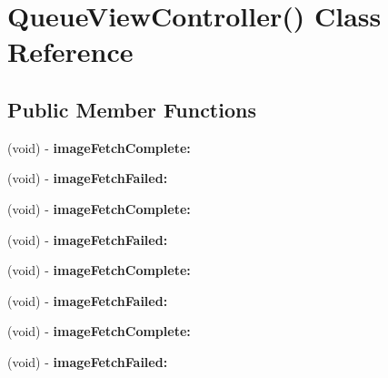 \hypertarget{interface_queue_view_controller_07_08}{
\section{\-Queue\-View\-Controller() \-Class \-Reference}
\label{interface_queue_view_controller_07_08}
}
\subsection*{\-Public \-Member \-Functions}
\begin{DoxyCompactItemize}
\item 
\hypertarget{interface_queue_view_controller_07_08_a1e28d548555b4e9bf66edc2ab9dcfb21}{
(void) -\/ {\bfseries image\-Fetch\-Complete\-:}}
\label{interface_queue_view_controller_07_08_a1e28d548555b4e9bf66edc2ab9dcfb21}

\item 
\hypertarget{interface_queue_view_controller_07_08_ad374c24829f4b37d327caa3f44343633}{
(void) -\/ {\bfseries image\-Fetch\-Failed\-:}}
\label{interface_queue_view_controller_07_08_ad374c24829f4b37d327caa3f44343633}

\item 
\hypertarget{interface_queue_view_controller_07_08_a1e28d548555b4e9bf66edc2ab9dcfb21}{
(void) -\/ {\bfseries image\-Fetch\-Complete\-:}}
\label{interface_queue_view_controller_07_08_a1e28d548555b4e9bf66edc2ab9dcfb21}

\item 
\hypertarget{interface_queue_view_controller_07_08_ad374c24829f4b37d327caa3f44343633}{
(void) -\/ {\bfseries image\-Fetch\-Failed\-:}}
\label{interface_queue_view_controller_07_08_ad374c24829f4b37d327caa3f44343633}

\item 
\hypertarget{interface_queue_view_controller_07_08_a1e28d548555b4e9bf66edc2ab9dcfb21}{
(void) -\/ {\bfseries image\-Fetch\-Complete\-:}}
\label{interface_queue_view_controller_07_08_a1e28d548555b4e9bf66edc2ab9dcfb21}

\item 
\hypertarget{interface_queue_view_controller_07_08_ad374c24829f4b37d327caa3f44343633}{
(void) -\/ {\bfseries image\-Fetch\-Failed\-:}}
\label{interface_queue_view_controller_07_08_ad374c24829f4b37d327caa3f44343633}

\item 
\hypertarget{interface_queue_view_controller_07_08_a1e28d548555b4e9bf66edc2ab9dcfb21}{
(void) -\/ {\bfseries image\-Fetch\-Complete\-:}}
\label{interface_queue_view_controller_07_08_a1e28d548555b4e9bf66edc2ab9dcfb21}

\item 
\hypertarget{interface_queue_view_controller_07_08_ad374c24829f4b37d327caa3f44343633}{
(void) -\/ {\bfseries image\-Fetch\-Failed\-:}}
\label{interface_queue_view_controller_07_08_ad374c24829f4b37d327caa3f44343633}

\end{DoxyCompactItemize}


